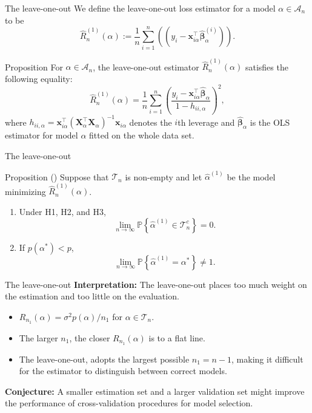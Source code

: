 \documentclass{beamer}
\newcommand{\0}{\emptyset}
\newcommand{\prob}{\mathbb{P}}
\newcommand{\paren}[1]{\left(#1 \right)}
\newcommand{\set}[1]{\left\{ #1 \right\}}
\newcommand{\Acal}{\mathcal{A}_{n}}
\newcommand{\Tcal}{\mathcal{T}_{n}}
\newcommand{\X}{\boldsymbol{X}}
\newcommand{\x}{\boldsymbol{x}}
\newcommand{\bbetahat}{\boldsymbol{\hat{\beta}}}
\newcommand{\alphahat}[1]{\hat{\alpha}^{#1}}
\newcommand{\loocv}[1]{\hat{R}^{(1)}_{n}\paren{#1}}
\newcommand{\1}{\mathmybb{1}}
\begin{document}
\begin{frame}{The leave-one-out}
    We define the leave-one-out loss estimator for a model \(\alpha\in\Acal\) to be 
    \[\loocv{\alpha} := \frac{1}{n}\sum_{i=1}^{n}\paren{(y_{i} - \x_{i\alpha}^{\top}\bbetahat_{\alpha}^{(i)})}.\]

    \begin{block}{Proposition}
        For \(\alpha\in\Acal\), the leave-one-out estimator \(\loocv{\alpha}\) satisfies the following equality:
        \[\loocv{\alpha}= \frac{1}{n}\sum_{i=1}^{n}\paren{\frac{y_{i}-\x_{i\alpha}^{\top}\bbetahat_{\alpha}}{1-h_{ii,\alpha}}}^{2},\]
        where \(h_{ii,\alpha} = \x_{i\alpha}^{\top}{(\X_{\alpha}^{\top}\X_{\alpha})}^{-1}\x_{i\alpha}\) denotes the \(i\)th leverage and \(\bbetahat_{\alpha}\) is the OLS estimator for model \(\alpha\) fitted on the whole data set.
    \end{block}
\end{frame}

\begin{frame}{The leave-one-out}
    \begin{block}{Proposition (\cite{shao_1993})}
        Suppose that \(\Tcal\) is non-empty and let \(\alphahat{(1)}\) be the model minimizing \(\loocv{\alpha}\).
            \begin{enumerate}
                \item Under H1, H2, and H3, \[\lim_{n\to\infty}\prob\set{\alphahat{(1)}\in\Tcal^{c}}=0.\]
                \item If \(p(\alpha^*) < p\), \[\lim_{n\to\infty}\prob\set{\alphahat{(1)}=\alpha^{*}}\neq 1.\]
            \end{enumerate}
    \end{block}
\end{frame}

\begin{frame}{The leave-one-out}
    \textbf{Interpretation: } The leave-one-out places too much weight on the estimation and too little on the evaluation.
    \begin{itemize}
        \item \(R_{n_{1}}(\alpha) = \sigma^{2}p(\alpha)/n_{1}\) for \(\alpha\in\Tcal\).
        \item The larger \(n_{1}\), the closer \(R_{n_{1}}(\alpha)\) is to a flat line.
        \item The leave-one-out, adopts the largest possible \(n_{1}= n-1\), making it difficult for the estimator to distinguish between correct models.
      \end{itemize}  

    \textbf{Conjecture: } A smaller estimation set and a larger validation set might improve the performance of cross-validation procedures for model selection.
\end{frame}
\end{document}

